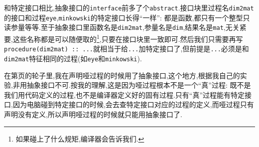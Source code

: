 和特定接口相比,抽象接口的\texttt{interface}前多了个\texttt{abstract}.接口块里过程名\texttt{dim2mat}的接口和过程\texttt{eye},\texttt{minkowski}的特定接口长得``一样'': 都是函数,都只有一个整型只读参量等等.至于抽象接口里函数名是\texttt{dim2mat},参量名是\texttt{dim},结果名是\texttt{mat},无关紧要,这些名称都是可以随便取的\footnote{如果碰上了什么规矩,编译器会告诉我们.},只要在接口块里一致即可.然后我们只需要再写\texttt{procedure(dim2mat) :: ...}就相当于给\texttt{...}加特定接口了,但前提是\texttt{...}必须是和\texttt{dim2mat}特征相同的过程(如\texttt{eye}和\texttt{minkowski}).

在第\pageref{dummy_procedure_program}页的轮子里,我在声明哑过程的时候用了抽象接口,这个地方,根据我自己的实验,非用抽象接口不可.按我的理解,这是因为哑过程根本不是一个``真''过程: 既不是我们用代码定义的过程,也不是编译器定义好的固有过程.只有``真''过程能有特定接口,因为电脑碰到特定接口的时候,会去查特定接口对应的过程的定义,而哑过程只有声明没有定义,所以声明哑过程的时候就只能用抽象接口了.
